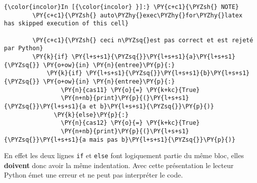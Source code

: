     \begin{Verbatim}[commandchars=\\\{\},frame=single,framerule=0.3mm,rulecolor=\color{cellframecolor}]
{\color{incolor}In [{\color{incolor} }]:} \PY{c+c1}{\PYZsh{} NOTE}
        \PY{c+c1}{\PYZsh{} auto\PYZhy{}exec\PYZhy{}for\PYZhy{}latex has skipped execution of this cell}
        
        \PY{c+c1}{\PYZsh{} ceci n\PYZsq{}est pas correct et est rejeté par Python}
        \PY{k}{if} \PY{l+s+s1}{\PYZsq{}}\PY{l+s+s1}{a}\PY{l+s+s1}{\PYZsq{}} \PY{o+ow}{in} \PY{n}{entree}\PY{p}{:}
            \PY{k}{if} \PY{l+s+s1}{\PYZsq{}}\PY{l+s+s1}{b}\PY{l+s+s1}{\PYZsq{}} \PY{o+ow}{in} \PY{n}{entree}\PY{p}{:}
                \PY{n}{cas11} \PY{o}{=} \PY{k+kc}{True}
                \PY{n+nb}{print}\PY{p}{(}\PY{l+s+s1}{\PYZsq{}}\PY{l+s+s1}{a et b}\PY{l+s+s1}{\PYZsq{}}\PY{p}{)}
              \PY{k}{else}\PY{p}{:}
                \PY{n}{cas12} \PY{o}{=} \PY{k+kc}{True}
                \PY{n+nb}{print}\PY{p}{(}\PY{l+s+s1}{\PYZsq{}}\PY{l+s+s1}{a mais pas b}\PY{l+s+s1}{\PYZsq{}}\PY{p}{)}
\end{Verbatim}


    En effet les deux lignes \texttt{if} et \texttt{else} font logiquement
partie du même bloc, elles \textbf{doivent} donc avoir la même
indentation. Avec cette présentation le lecteur Python émet une erreur
et ne peut pas interpréter le code.


    
    
    
